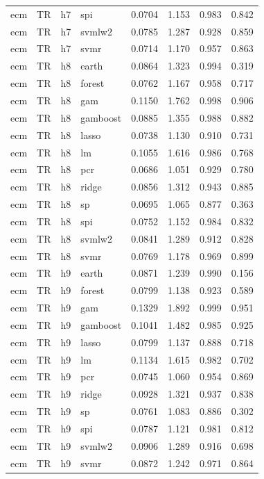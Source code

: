 \begin{ThreePartTable}
\begin{longtable}[t]{llclcccc}
ecm & TR & h7 & spi & 0.0704 & 1.153 & 0.983 & 0.842\\
ecm & TR & h7 & svmlw2 & 0.0785 & 1.287 & 0.928 & 0.859\\
ecm & TR & h7 & svmr & 0.0714 & 1.170 & 0.957 & 0.863\\
\addlinespace
ecm & TR & h8 & earth & 0.0864 & 1.323 & 0.994 & 0.319\\
ecm & TR & h8 & forest & 0.0762 & 1.167 & 0.958 & 0.717\\
ecm & TR & h8 & gam & 0.1150 & 1.762 & 0.998 & 0.906\\
ecm & TR & h8 & gamboost & 0.0885 & 1.355 & 0.988 & 0.882\\
ecm & TR & h8 & lasso & 0.0738 & 1.130 & 0.910 & 0.731\\
ecm & TR & h8 & lm & 0.1055 & 1.616 & 0.986 & 0.768\\
ecm & TR & h8 & pcr & 0.0686 & 1.051 & 0.929 & 0.780\\
ecm & TR & h8 & ridge & 0.0856 & 1.312 & 0.943 & 0.885\\
ecm & TR & h8 & sp & 0.0695 & 1.065 & 0.877 & 0.363\\
ecm & TR & h8 & spi & 0.0752 & 1.152 & 0.984 & 0.832\\
ecm & TR & h8 & svmlw2 & 0.0841 & 1.289 & 0.912 & 0.828\\
ecm & TR & h8 & svmr & 0.0769 & 1.178 & 0.969 & 0.899\\
\addlinespace
ecm & TR & h9 & earth & 0.0871 & 1.239 & 0.990 & 0.156\\
ecm & TR & h9 & forest & 0.0799 & 1.138 & 0.923 & 0.589\\
ecm & TR & h9 & gam & 0.1329 & 1.892 & 0.999 & 0.951\\
ecm & TR & h9 & gamboost & 0.1041 & 1.482 & 0.985 & 0.925\\
ecm & TR & h9 & lasso & 0.0799 & 1.137 & 0.888 & 0.718\\
ecm & TR & h9 & lm & 0.1134 & 1.615 & 0.982 & 0.702\\
ecm & TR & h9 & pcr & 0.0745 & 1.060 & 0.954 & 0.869\\
ecm & TR & h9 & ridge & 0.0928 & 1.321 & 0.937 & 0.838\\
ecm & TR & h9 & sp & 0.0761 & 1.083 & 0.886 & 0.302\\
ecm & TR & h9 & spi & 0.0787 & 1.121 & 0.981 & 0.812\\
ecm & TR & h9 & svmlw2 & 0.0906 & 1.289 & 0.916 & 0.698\\
ecm & TR & h9 & svmr & 0.0872 & 1.242 & 0.971 & 0.864\\

\end{longtable}
\end{ThreePartTable}
